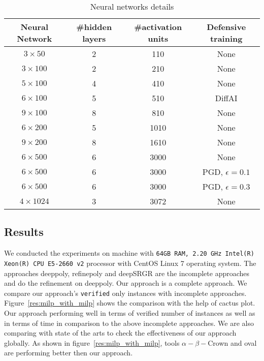 \begin{table}
    \centering
    \begin{tabular}{c|c|c|c}
        \hline
        \textbf{Neural Network} & \textbf{\#hidden layers} & \textbf{\#activation units} & \textbf{Defensive training} \\
        \hline
        $3\times 50$ & 2 & 110 & None \\
        $3\times 100$ & 2 & 210 & None  \\
        $5\times 100$ & 4 & 410 & None  \\
        $6\times 100$ & 5 & 510 & DiffAI \\
        $9\times 100$ & 8 & 810 & None  \\
        $6\times 200$ & 5 & 1010 & None  \\
        $9\times 200$ & 8 & 1610 & None  \\
        $6\times 500$ & 6 & 3000 & None  \\
        $6\times 500$ & 6 & 3000 & PGD, $\epsilon = 0.1$ \\
        $6\times 500$ & 6 & 3000 & PGD, $\epsilon = 0.3$ \\
        $4\times 1024$ & 3 & 3072 & None  \\
        \hline
    \end{tabular}
    \caption{Neural networks details}
    \label{tb:nndetail}
\end{table}

\subsection{Results}
We conducted the experiments on machine with \texttt{64GB RAM, 2.20 GHz Intel(R) Xeon(R) CPU E5-2660 v2}
processor with CentOS Linux 7 operating system.   
The approaches deeppoly, refinepoly and deepSRGR are the incomplete approaches and do the refinement on deeppoly. 
Our approach is a complete approach. We compare our approach's \texttt{verified} only instances with incomplete approaches. 
Figure~\ref{res:milp_with_milp} shows the comparison with the help of cactus plot. Our approach performing well 
in terms of verified number of instances as well as in terms of time in comparison to the above incomplete approaches. 
We are also comparing with state of the arts to check the effectiveness of our approach globally.
As shown in figure~\ref{res:milp_with_milp}, tools $\alpha - \beta-$Crown and oval are performing better then our approach. 





